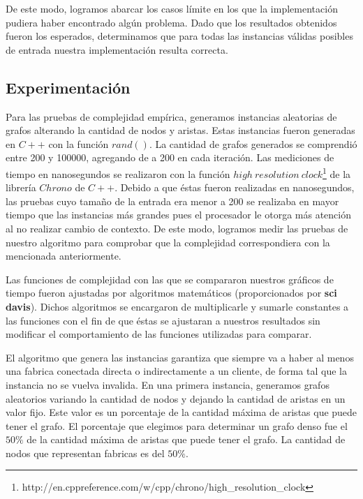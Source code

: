 De este modo, logramos abarcar los casos límite en los que la implementación pudiera haber encontrado algún problema. Dado que los resultados obtenidos fueron los esperados, determinamos que para todas las instancias válidas posibles de entrada nuestra implementación resulta correcta.

\subsection{Experimentación}
Para las pruebas de complejidad empírica, generamos instancias aleatorias de grafos alterando la cantidad de nodos y aristas. Estas instancias fueron generadas en $C++$ con la función $rand()$. La cantidad de grafos generados se comprendió entre 200 y 100000, agregando de a 200 en cada iteración. Las mediciones de tiempo en nanosegundos se realizaron con la función $high\ resolution\ clock$\footnote{http://en.cppreference.com/w/cpp/chrono/high\_resolution\_clock} de la librería $Chrono$ de $C++$. Debido a que éstas fueron realizadas en nanosegundos, las pruebas cuyo tamaño de la entrada era menor a 200 se realizaba en mayor tiempo que las instancias más grandes pues el procesador le otorga más atención al no realizar cambio de contexto. De este modo, logramos medir las pruebas de nuestro algoritmo para comprobar que la complejidad correspondiera con la mencionada anteriormente.

Las funciones de complejidad con las que se compararon nuestros gráficos de tiempo fueron ajustadas por algoritmos matemáticos (proporcionados por \textbf{sci davis}). Dichos algoritmos se encargaron de multiplicarle y sumarle constantes a las funciones con el fin de que éstas se ajustaran a nuestros resultados sin modificar el comportamiento de las funciones utilizadas para comparar.

El algoritmo que genera las instancias garantiza que siempre va a haber al menos una fabrica conectada directa o indirectamente a un cliente, de forma tal que la instancia no se vuelva invalida.
\newpage
En una primera instancia, generamos grafos aleatorios variando la cantidad de nodos y dejando la cantidad de aristas en un valor fijo. Este valor es un porcentaje de la cantidad máxima de aristas que puede tener el grafo. El porcentaje que elegimos para determinar un grafo denso fue el $50\%$ de la cantidad máxima de aristas que puede tener el grafo. La cantidad de nodos que representan fabricas es del $50\%$.

